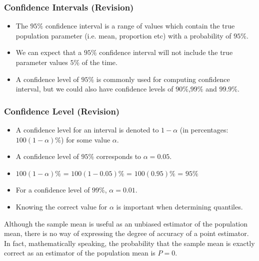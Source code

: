 \documentclass[]{report}
\begin{document}
{{\subsubsection{Confidence Intervals (Revision) }

\begin{itemize}
\item The $95\%$ confidence interval is a range of values which contain the true population parameter (i.e. mean, proportion etc) with a probability of $95\%$.
\item We can expect that a $95\%$ confidence interval will not include the true parameter values $5\%$ of the time.
\item A confidence level of $95\%$ is commonly used for computing confidence interval, but we could also have confidence levels of $90\%$,$99\%$ and $99.9\%$.
\end{itemize}






\subsubsection{Confidence Level (Revision) }

\begin{itemize}
\item A confidence level for an interval is denoted to $1-\alpha$ (in percentages: $100(1-\alpha)\%$) for some value $\alpha$.
\item A confidence level of $95\%$ corresponds to $\alpha = 0.05$.
\item $100(1-\alpha)\%$ = $100(1-0.05)\%$  = $100(0.95)\%$ = $95\%$
\item For a confidence level of $99\%$, $\alpha = 0.01$.
\item Knowing the correct value for $\alpha$ is important when determining quantiles.
\end{itemize}









Although the sample mean is useful as an unbiased estimator of the population mean, there is no way of
expressing the degree of accuracy of a point estimator. In fact, mathematically speaking, the probability that the
sample mean is exactly correct as an estimator of the population mean is $P = 0$.

}}
\end{document}

